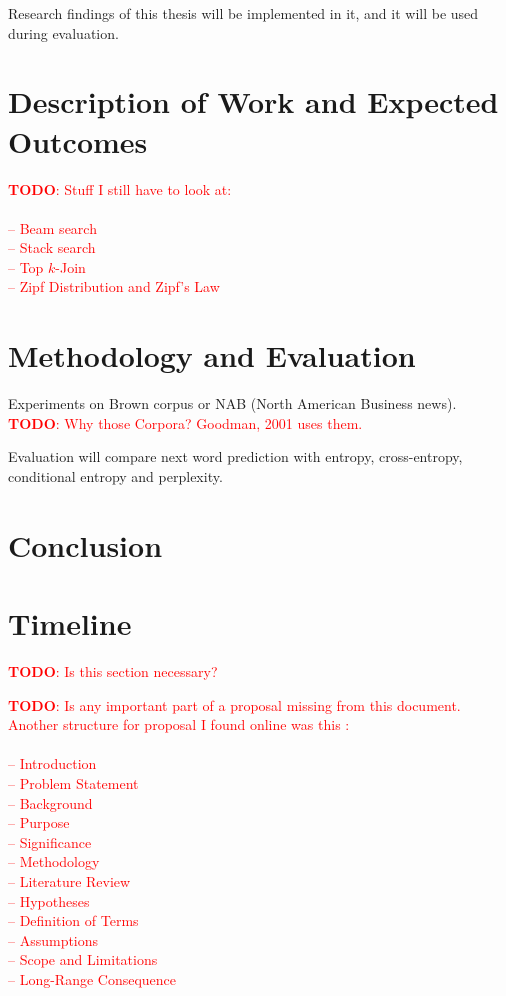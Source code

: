 \documentclass[11pt,a4paper]{article}
\newcommand{\todo}[1]{\textcolor{red}{\textbf{TODO}: #1}}
\begin{document}
Research findings of this thesis will be implemented in it, and it will be used
during evaluation.

\section{Description of Work and Expected Outcomes}

\todo{Stuff I still have to look at:\\
\\
-- Beam search \\
-- Stack search \\
-- Top $k$-Join \\
-- Zipf Distribution and Zipf's Law
}

\section{Methodology and Evaluation}

Experiments on Brown corpus or NAB (North American Business news).
\todo{Why those Corpora? Goodman, 2001 uses them.}

Evaluation will compare next word prediction with entropy, cross-entropy,
conditional entropy and perplexity.

\section{Conclusion}

\section{Timeline}

\todo{Is this section necessary?}

\todo{Is any important part of a proposal missing from this document. Another
structure for proposal I found online was this :\\
\\
-- Introduction \\
-- Problem Statement \\
-- Background \\
-- Purpose \\
-- Significance \\
-- Methodology \\
-- Literature Review \\
-- Hypotheses \\
-- Definition of Terms \\
-- Assumptions \\
-- Scope and Limitations \\
-- Long-Range Consequence
}
\end{document}
